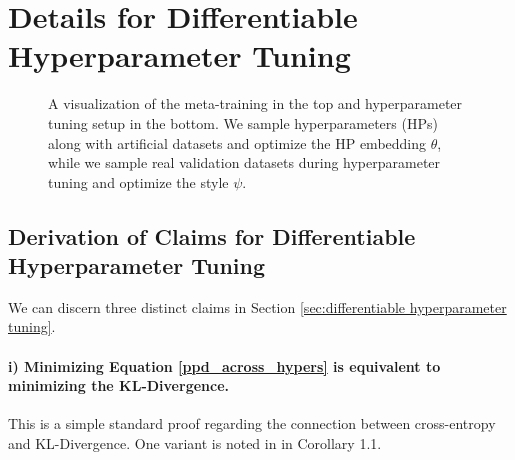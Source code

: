 \documentclass{article}
\begin{document}
\section{Details for Differentiable Hyperparameter Tuning}
\begin{figure}[t]
    \centering
    \begin{subfigure}[b]{1.\textwidth}
        \centering
        
    \end{subfigure}
    \vspace{.3cm}
    \begin{subfigure}[b]{1.\textwidth}
        \centering
        
    \end{subfigure}
    \caption{A visualization of the meta-training in the top and hyperparameter tuning setup in the bottom. We sample hyperparameters (HPs) along with artificial datasets and optimize the HP embedding $\theta$, while we sample real validation datasets during hyperparameter tuning and optimize the style $\psi$.}
    \label{overview_diffable_train_valid}
\end{figure}
\subsection{Derivation of Claims for Differentiable Hyperparameter Tuning}
\label{app:diff_proof}
We can discern three distinct claims in Section \ref{sec:differentiable hyperparameter tuning}.\\
\paragraph{i) Minimizing Equation \ref{ppd_across_hypers} is equivalent to minimizing the KL-Divergence.} This is a simple standard proof regarding the connection between cross-entropy and KL-Divergence. One variant is noted in \citet{muller-iclr2022} in Corollary 1.1.
\end{document}
